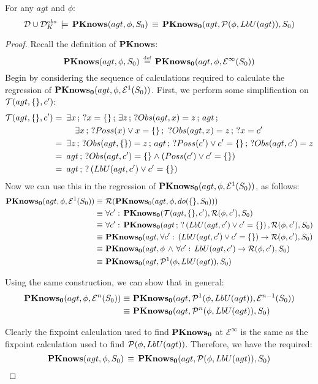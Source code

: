 \begin{thmext}
[{\ref{thm:Pknows_LbU_S0}}] For any $agt$ and $\phi$:\[
\mathcal{D}\cup\mathcal{D}_{K}^{obs}\,\models\,\mathbf{PKnows}(agt,\phi,S_{0})\,\equiv\,\mathbf{PKnows_{0}}(agt,\mathcal{P}(\phi,LbU(agt)),S_{0})\]

\end{thmext}
\begin{proof}
Recall the definition of $\mathbf{PKnows}$:\[
\mathbf{PKnows}(agt,\phi,S_{0})\,\stackrel{\mbox{\tiny def}}{=}\,\mathbf{PKnows_{0}}(agt,\phi,\mathcal{E}^{\infty}(S_{0}))\]
Begin by considering the sequence of calculations required to calculate
the regression of $\mathbf{PKnows_{0}}(agt,\phi,\mathcal{E}^{1}(S_{0}))$. First,
we perform some simplification on $\mathcal{T}(agt,\{\},c')$:\begin{align*}
\mathcal{T}(agt,\{\},c')=\,\,\, & \exists x\,;\,?x=\{\}\,;\,\exists z\,;\,?Obs(agt,x)=z\,;\, agt\,;\\
 & \,\,\,\,\,\,\exists x\,;\,?Poss(x)\vee x=\{\}\,;\,\,?Obs(agt,x)=z\,;\,?x=c'\\
=\,\,\, & \exists z\,;\,?Obs(agt,\{\})=z\,;\, agt\,;\,?Poss(c')\vee c'=\{\}\,;\,?Obs(agt,c')=z\\
=\,\,\, & agt\,;\,?Obs(agt,c')=\{\}\wedge\left(Poss(c')\vee c'=\{\}\right)\\
=\,\,\, & agt\,;\,?\left(LbU(agt,c')\vee c'=\{\}\right)\end{align*}
 Now we can use this in the regression of $\mathbf{PKnows_{0}}(agt,\phi,\mathcal{E}^{1}(S_{0}))$,
as follows: \begin{align*}
\mathbf{PKnows_{0}}(agt,\phi,\mathcal{E}^{1}(S_{0}))\equiv\,\, & \mathcal{R}(\mathbf{PKnows}_{0}(agt,\phi,do(\{\},S_{0})))\\
\equiv\,\, & \forall c':\,\mathbf{PKnows_{0}}(\mathcal{T}(agt,\{\},c'),\mathcal{R}(\phi,c'),S_{0})\\
\equiv\,\, & \forall c':\,\mathbf{PKnows_{0}}(agt\,;\,?\left(LbU(agt,c')\vee c'=\{\}\right),\mathcal{R}(\phi,c'),S_{0})\\
\equiv\,\, & \mathbf{PKnows_{0}}(agt,\forall c':\,\left(LbU(agt,c')\vee c'=\{\}\right)\rightarrow\mathcal{R}(\phi,c'),S_{0})\\
\equiv\,\, & \mathbf{PKnows_{0}}(agt,\phi\,\wedge\,\forall c':\, LbU(agt,c')\rightarrow\mathcal{R}(\phi,c'),S_{0})\\
\equiv\,\, & \mathbf{PKnows_{0}}(agt,\mathcal{P}^{1}(\phi,LbU(agt)),S_{0})\end{align*}


Using the same construction, we can show that in general:\begin{align*}
\mathbf{PKnows_{0}}(agt,\phi,\mathcal{E}^{n}(S_{0}))\equiv\,\, & \mathbf{PKnows_{0}}(agt,\mathcal{P}^{1}(\phi,LbU(agt)),\mathcal{E}^{n-1}(S_{0}))\\
\equiv\,\, & \mathbf{PKnows_{0}}(agt,\mathcal{P}^{n}(\phi,LbU(agt)),S_{0})\end{align*}


Clearly the fixpoint calculation used to find $\mathbf{PKnows_{0}}$ at $\mathcal{E}^{\infty}$
is the same as the fixpoint calculation used to find $\mathcal{P}(\phi,LbU(agt))$.
Therefore, we have the required:\[
\mathbf{PKnows}(agt,\phi,S_{0})\,\equiv\,\mathbf{PKnows_{0}}(agt,\mathcal{P}(\phi,LbU(agt)),S_{0})\]

\end{proof}
\medskip{}


